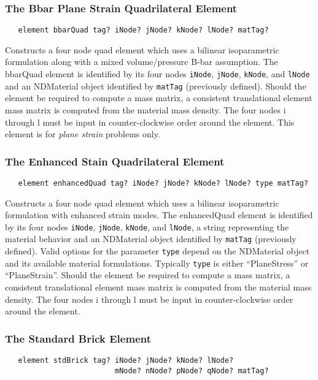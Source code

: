 \documentclass[12pt]{article}
\begin{document}
\subsubsection{The Bbar Plane Strain Quadrilateral Element}
{\sf\small
\begin{verbatim}
   element bbarQuad tag? iNode? jNode? kNode? lNode? matTag? 
\end{verbatim}
}

\noindent Constructs a four node quad
element which uses a bilinear isoparametric formulation along with
a mixed volume/pressure B-bar assumption.
The bbarQuad element is identified by its four nodes
{\tt iNode}, {\tt jNode}, {\tt kNode}, and {\tt lNode}
and an NDMaterial object identified by {\tt matTag} (previously
defined). 
Should the element be required to compute a mass matrix, a consistent 
translational element mass matrix is computed from the material
mass density.
The four nodes i through l must be input in
counter-clockwise order around the element.
This element is for {\em plane strain} problems \p only.


\subsubsection{The Enhanced Stain Quadrilateral Element}
{\sf\small
\begin{verbatim}
   element enhancedQuad tag? iNode? jNode? kNode? lNode? type matTag? 
\end{verbatim}
}

\noindent Constructs a four node quad element which uses a bilinear
isoparametric formulation with enhanced strain modes.
The enhancedQuad element is identified by its four nodes
{\tt iNode}, {\tt jNode}, {\tt kNode}, and {\tt lNode}, 
a string representing the material behavior
and an NDMaterial object identified by {\tt matTag} (previously
defined). 
Valid options for the parameter {\tt type} depend on the
NDMaterial object and its available material formulations.
Typically {\tt type} is either ``PlaneStress'' or ``PlaneStrain''.
Should the element be required to compute a mass matrix, a consistent 
translational element mass matrix is computed from the material
mass density. The four nodes i through l must be input in
counter-clockwise order around the element.


\subsubsection{The Standard Brick Element}
{\sf\small
\begin{verbatim}
   element stdBrick tag? iNode? jNode? kNode? lNode? 
                         mNode? nNode? pNode? qNode? matTag?
\end{verbatim}
}
\end{document}
